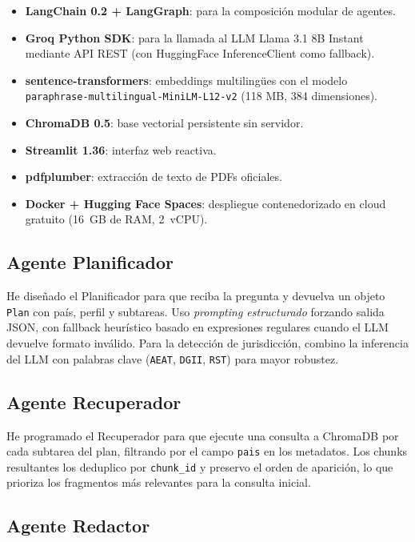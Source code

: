 \documentclass[11pt,a4paper]{article}
\begin{document}
\begin{itemize}
  \item \textbf{LangChain 0.2 + LangGraph}: para la composición modular de agentes.
  \item \textbf{Groq Python SDK}: para la llamada al LLM Llama 3.1 8B Instant mediante API REST (con HuggingFace InferenceClient como fallback).
  \item \textbf{sentence-transformers}: embeddings multilingües con el modelo \texttt{paraphrase-multilingual-MiniLM-L12-v2} (118 MB, 384 dimensiones).
  \item \textbf{ChromaDB 0.5}: base vectorial persistente sin servidor.
  \item \textbf{Streamlit 1.36}: interfaz web reactiva.
  \item \textbf{pdfplumber}: extracción de texto de PDFs oficiales.
  \item \textbf{Docker + Hugging Face Spaces}: despliegue contenedorizado en cloud gratuito (16~GB de RAM, 2~vCPU).
\end{itemize}

\subsection{Agente Planificador}

He diseñado el Planificador para que reciba la pregunta y devuelva un objeto \texttt{Plan} con país, perfil y subtareas. Uso \emph{prompting estructurado} forzando salida JSON, con fallback heurístico basado en expresiones regulares cuando el LLM devuelve formato inválido. Para la detección de jurisdicción, combino la inferencia del LLM con palabras clave (\texttt{AEAT}, \texttt{DGII}, \texttt{RST}) para mayor robustez.

\subsection{Agente Recuperador}

He programado el Recuperador para que ejecute una consulta a ChromaDB por cada subtarea del plan, filtrando por el campo \texttt{pais} en los metadatos. Los chunks resultantes los deduplico por \texttt{chunk\_id} y preservo el orden de aparición, lo que prioriza los fragmentos más relevantes para la consulta inicial.

\subsection{Agente Redactor}
\end{document}
